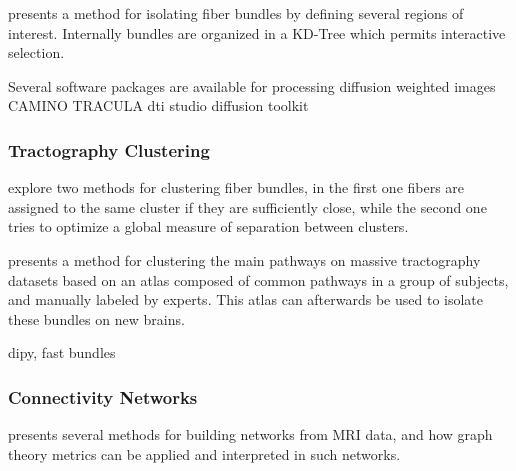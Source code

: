 
\autocite{blaas_fast_2005} presents a method for isolating fiber bundles by defining several regions of interest. Internally bundles are organized in a KD-Tree which permits interactive selection.


Several software packages are available for processing diffusion weighted images \autocite{hasan_review_2011}
CAMINO \autocite{cook_camino:_2006}
TRACULA \autocite{yendiki_probabilistic_2008}
\autocite{jiang_dtistudio:_2006} dti studio
\autocite{wang_diffusion_2007} diffusion toolkit

























\subsubsection{Tractography Clustering}

\autocite{song_zhang_identifying_2008} explore two methods for clustering fiber bundles, in the first one fibers are assigned to the same cluster if they are sufficiently close, while the second one tries to optimize a global measure of separation between clusters.

\autocite{guevara_automatic_2012} presents a method for clustering the main pathways on massive tractography datasets based on an atlas composed of common pathways in a group of subjects, and manually labeled by experts. This atlas can afterwards be used to isolate these bundles on new brains.


\autocite{garyfallidis_dipy_2014} dipy, fast bundles

\subsubsection{Connectivity Networks}

\autocite{rubinov_complex_2010} presents several methods for building networks from MRI data, and how graph theory metrics can be applied and interpreted in such networks.

